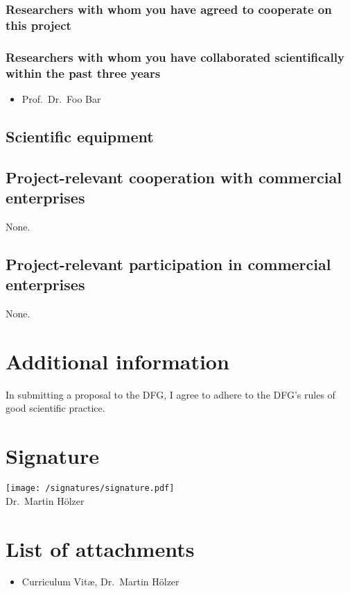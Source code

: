 \documentclass{scrartcl}
\begin{document}
\subsubsection{Researchers with whom you have agreed to cooperate on this project}

\subsubsection{Researchers with whom you have collaborated scientifically within the past three years}
\begin{itemize}
  \item Prof.\ Dr.\ Foo Bar
\end{itemize}

\subsection{Scientific equipment}

\subsection{Project-relevant cooperation with commercial enterprises}
None.

\subsection{Project-relevant participation in commercial enterprises}
None.

\section{Additional information}
In submitting a proposal to the DFG, I agree to adhere to the DFG's rules of
good scientific practice.

\section{Signature}

\texttt{[image: /signatures/signature.pdf]}\\
Dr.\ Martin H\"olzer

\section{List of attachments}
\begin{itemize}
  \item Curriculum Vit\ae, Dr.\ Martin H\"olzer
\end{itemize}
\end{document}

